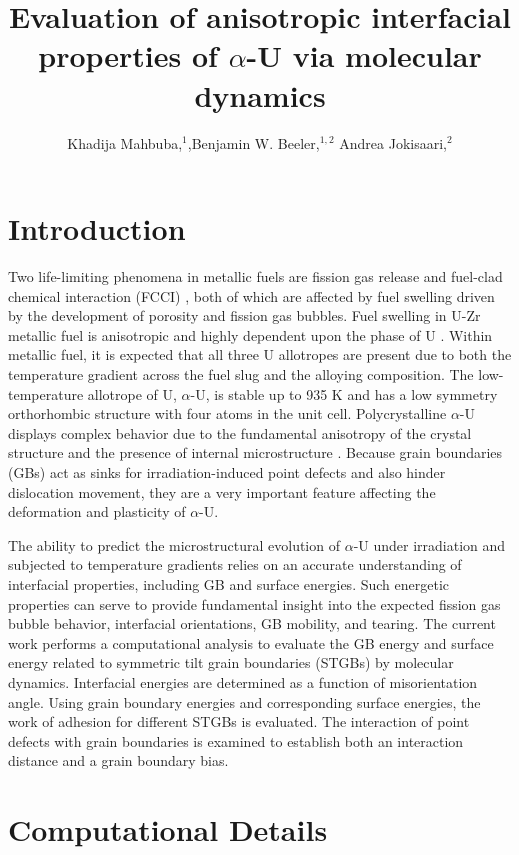 \documentclass{anstrans}
\title{Evaluation of anisotropic interfacial properties of $\alpha$-U via molecular dynamics}
\author{Khadija Mahbuba,$^{1}$,Benjamin W. Beeler,$^{1,2}$ Andrea Jokisaari,$^{2}$ }
\institute{
$^{1}$North Carolina State University, Department of Nuclear Engineering, Raleigh, NC 27607
\and
$^{2}$Fuel Modeling and Simulation Department, Idaho National Laboratory, Idaho Falls, ID 83415

}
\begin{document}
\section{Introduction}
Two life-limiting phenomena in metallic fuels are fission gas release and fuel-clad chemical interaction (FCCI) \cite{carmack2009}, both of which are affected by fuel swelling driven by the development of porosity and fission gas bubbles. Fuel swelling in U-Zr metallic fuel is anisotropic and highly dependent upon the phase of U \cite{hofman2015}. Within metallic fuel, it is expected that all three U allotropes are present due to both the temperature gradient across the fuel slug and the alloying composition. The low-temperature allotrope of U, $\alpha$-U, is stable up to 935 K \cite{hofman1996} and has a low symmetry orthorhombic structure with four atoms in the unit cell. Polycrystalline $\alpha$-U displays complex behavior due to the fundamental anisotropy of the crystal structure and the presence of internal microstructure \cite{barrett2020}. Because grain boundaries (GBs) act as sinks for irradiation-induced point defects and also hinder dislocation movement, they are a very important feature affecting the deformation and plasticity of $\alpha$-U.

The ability to predict the microstructural evolution of $\alpha$-U under irradiation and subjected to temperature gradients relies on an accurate understanding of interfacial properties, including GB and surface energies. Such energetic properties can serve to provide fundamental insight into the expected fission gas bubble behavior, interfacial orientations, GB mobility, and tearing. The current work performs a computational analysis to evaluate the GB energy and surface energy related to symmetric tilt grain boundaries (STGBs) by molecular dynamics. Interfacial energies are determined as a function of misorientation angle. Using grain boundary energies and corresponding surface energies, the work of adhesion for different STGBs is evaluated. The interaction of point defects with grain boundaries is examined to establish both an interaction distance and a grain boundary bias.


\section{Computational Details}
\end{document}
